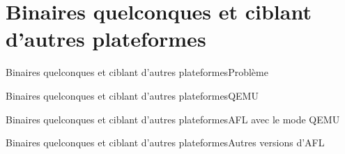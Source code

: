 \section{Binaires quelconques et ciblant d'autres plateformes}

\begin{frame}{Binaires quelconques et ciblant d'autres plateformes}{Problème}
\end{frame}

\begin{frame}{Binaires quelconques et ciblant d'autres plateformes}{QEMU}
\end{frame}

\begin{frame}{Binaires quelconques et ciblant d'autres plateformes}{AFL avec le mode QEMU}
\end{frame}

\begin{frame}{Binaires quelconques et ciblant d'autres plateformes}{Autres versions d'AFL}
\end{frame}
